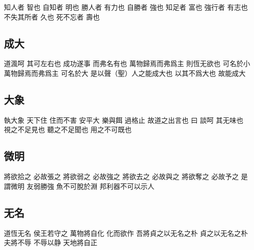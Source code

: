 \documentclass[a5paper,zihao=-4,oneside,UTF8]{ctexart}
\begin{document}
知人者 智也 自知者 明也 
勝人者 有力也 自勝者 強也 
知足者 富也 強行者 有志也 
不失其所者 久也 死不忘者 壽也 



\subsection{成大}



道渢呵 其可左右也 
成功遂事 而弗名有也 萬物歸焉而弗爲主 
則恆无欲也 可名於小 萬物歸焉而弗爲主 可名於大 
是以聲（聖）人之能成大也 以其不爲大也 故能成大 



\subsection{大象}



執大象 天下住 住而不害 安平大 
樂與餌 過格止 
故道之出言也 曰 談呵 其无味也 視之不足見也 聽之不足聞也 用之不可既也 



\subsection{微明}



將欲拾之 必故張之 將欲弱之 必故強之 將欲去之 必故與之 將欲奪之 必故予之 是謂微明 
友弱勝強 
魚不可脫於淵 邦利器不可以示人 



\subsection{无名}



道恆无名 
侯王若守之 萬物將自化 
化而欲作 吾將貞之以无名之朴 
貞之以无名之朴 夫將不辱 
不辱以静 天地將自正
\end{document}
